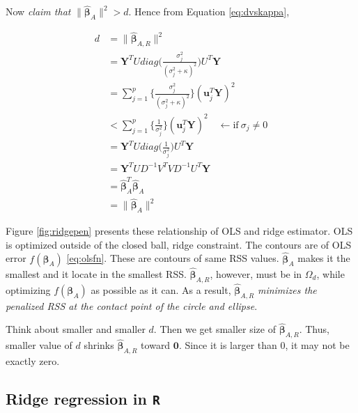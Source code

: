 \documentclass[]{book}
\theoremstyle{definition}
\theoremstyle{definition}
\theoremstyle{definition}
\theoremstyle{remark}
\begin{document}
Now \emph{claim that} \(\lVert \boldsymbol{\hat\beta}_{A} \rVert^2 > d\). Hence from Equation \eqref{eq:dvskappa},

\begin{equation*}
  \begin{split}
    d & = \lVert \boldsymbol{\hat\beta}_{A, R} \rVert^2 \\
    & = \mathbf{Y}^T U diag\bigg( \frac{\sigma_j^2}{(\sigma_j^2 + \kappa)^2} \bigg) U^T \mathbf{Y} \\
    & = \sum_{j = 1}^p \bigg\{ \frac{\sigma_j^2}{(\sigma_j^2 + \kappa)^2} \bigg\} (\mathbf{u}_j^T \mathbf{Y})^2 \\
    & < \sum_{j = 1}^p \bigg\{ \frac{1}{\sigma_j^2} \bigg\} (\mathbf{u}_j^T \mathbf{Y})^2 \quad \leftarrow \text{if}\: \sigma_j \neq 0 \\
    & = \mathbf{Y}^T U diag\bigg( \frac{1}{\sigma_j^2} \bigg) U^T \mathbf{Y} \\
    & = \mathbf{Y}^TUD^{-1}V^TVD^{-1}U^T \mathbf{Y} \\
    & = \boldsymbol{\hat\beta}_{A}^T \boldsymbol{\hat\beta}_{A} \\
    & = \lVert \boldsymbol{\hat\beta}_{A} \rVert^2
  \end{split}
\end{equation*}

Figure \ref{fig:ridgepen} presents these relationship of OLS and ridge estimator. OLS is optimized outside of the closed ball, ridge constraint. The contours are of OLS error \(f(\boldsymbol\beta_A)\) \eqref{eq:olsfn}. These are contours of same RSS values. \(\boldsymbol{\hat\beta}_{A}\) makes it the smallest and it locate in the smallest RSS. \(\boldsymbol{\hat\beta}_{A, R}\), however, must be in \(\Omega_d\), while optimizing \(f(\boldsymbol\beta_A)\) as possible as it can. As a result, \(\boldsymbol{\hat\beta}_{A, R}\) \emph{minimizes the penalized RSS at the contact point of the circle and ellipse}.

Think about smaller and smaller \(d\). Then we get smaller size of \(\boldsymbol{\hat\beta}_{A, R}\). Thus, smaller value of \(d\) shrinks \(\boldsymbol{\hat\beta}_{A, R}\) toward \(\mathbf{0}\). Since it is larger than \(0\), it may not be exactly zero.

\hypertarget{ridge-regression-in-r}{%
\subsection{\texorpdfstring{Ridge regression in \texttt{R}}{Ridge regression in R}}\label{ridge-regression-in-r}}
\end{document}
